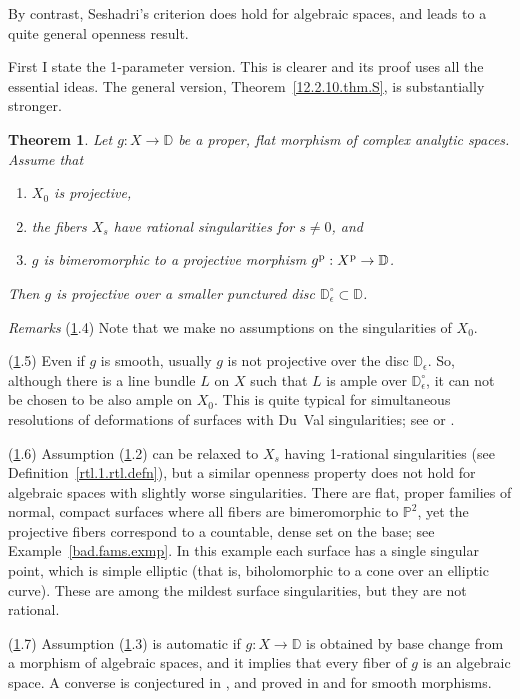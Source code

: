 \documentclass{amsart}
\newtheorem{thm}{Theorem}%
\theoremstyle{definition}
\theoremstyle{remark}
\newcommand{\dd}[0]{{\mathbb D}}
\newcommand{\p}[0]{{\mathbb P}}
\begin{document}
By contrast, Seshadri's criterion does hold for   algebraic spaces, and
leads to a quite general openness result. 


First I state the 1-parameter version. This is clearer and its proof uses all the essential ideas.
The general version, Theorem~\ref{12.2.10.thm.S}, is substantially stronger.

 

\begin{thm} \label{12.2.10.thm.dd}
Let $g:X\to \dd$ be a  proper, flat morphism of complex analytic spaces.
Assume that
\begin{enumerate}
  \item $X_0$ is projective, 
\item the fibers $X_s$ have rational singularities for $s\neq 0$, and
\item $g$ is bimeromorphic to a projective morphism $g^{\rm p}:X^{\rm p}\to \dd$.
\end{enumerate}
Then $g$ is projective over a smaller punctured disc  $\dd^\circ_\epsilon\subset \dd$.
\end{thm}


{\it Remarks} (\ref{12.2.10.thm.dd}.4)  Note that we make no assumptions on the singularities of $X_0$.

(\ref{12.2.10.thm.dd}.5)  Even if $g$ is smooth, usually $g$ is not projective over the disc $\dd_\epsilon$. So, although  there is a line bundle $L$ on $X$ such that
$L$ is ample over $\dd^\circ_\epsilon$, it can not be chosen to be also ample on $X_0$. This is quite typical for simultaneous resolutions of deformations of surfaces with Du~Val singularities;  see \cite{Atiyah58} or \cite[Exmp.4]{k-defgt}.

(\ref{12.2.10.thm.dd}.6)  Assumption (\ref{12.2.10.thm.dd}.2) can be relaxed to $X_s$ having 1-rational singularities  (see Definition~\ref{rtl.1.rtl.defn}), but  a similar  openness property does not hold  for  algebraic spaces with slightly worse singularities. 
There are  flat, proper families of normal, compact surfaces 
where all fibers are bimeromorphic to $\p^2$, yet 
the projective fibers correspond to  a countable, dense set on the base; see Example~\ref{bad.fams.exmp}.
In this example each surface has a single singular point, which is simple elliptic (that is, biholomorphic to a cone over an elliptic curve).
These are among the mildest surface singularities, but they are not rational.

(\ref{12.2.10.thm.dd}.7) Assumption (\ref{12.2.10.thm.dd}.3) is automatic if $g:X\to \dd$ is obtained by base change from a morphism of  algebraic spaces,  and it implies that every fiber of $g$ is an algebraic space.
A converse is conjectured in \cite[Conj.2]{k-moi}, and  proved in 
\cite[Thm.1.4]{rao-tsa-1} and \cite[Thm.1.2]{rao-tsa}  for smooth morphisms.
\end{document}
